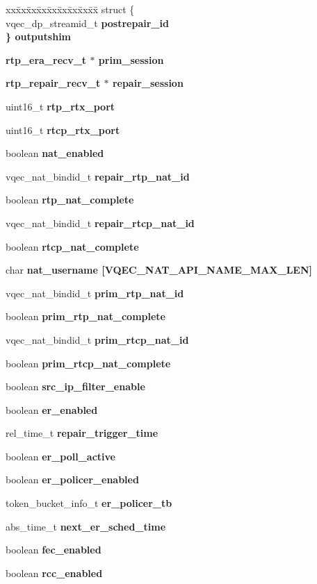 \begin{CompactItemize}
\begin{tabbing}
\end{tabbing}\item 
\begin{tabbing}
xx\=xx\=xx\=xx\=xx\=xx\=xx\=xx\=xx\=\kill
struct \{\\
\>vqec\_dp\_streamid\_t \bf{postrepair\_id}\\
\} \bf{outputshim}\\

\end{tabbing}\item 
\bf{rtp\_\-era\_\-recv\_\-t} $\ast$ \bf{prim\_\-session}
\item 
\bf{rtp\_\-repair\_\-recv\_\-t} $\ast$ \bf{repair\_\-session}
\item 
uint16\_\-t \bf{rtp\_\-rtx\_\-port}
\item 
uint16\_\-t \bf{rtcp\_\-rtx\_\-port}
\item 
boolean \bf{nat\_\-enabled}
\item 
vqec\_\-nat\_\-bindid\_\-t \bf{repair\_\-rtp\_\-nat\_\-id}
\item 
boolean \bf{rtp\_\-nat\_\-complete}
\item 
vqec\_\-nat\_\-bindid\_\-t \bf{repair\_\-rtcp\_\-nat\_\-id}
\item 
boolean \bf{rtcp\_\-nat\_\-complete}
\item 
char \bf{nat\_\-username} [VQEC\_\-NAT\_\-API\_\-NAME\_\-MAX\_\-LEN]
\item 
vqec\_\-nat\_\-bindid\_\-t \bf{prim\_\-rtp\_\-nat\_\-id}
\item 
boolean \bf{prim\_\-rtp\_\-nat\_\-complete}
\item 
vqec\_\-nat\_\-bindid\_\-t \bf{prim\_\-rtcp\_\-nat\_\-id}
\item 
boolean \bf{prim\_\-rtcp\_\-nat\_\-complete}
\item 
boolean \bf{src\_\-ip\_\-filter\_\-enable}
\item 
boolean \bf{er\_\-enabled}
\item 
rel\_\-time\_\-t \bf{repair\_\-trigger\_\-time}
\item 
boolean \bf{er\_\-poll\_\-active}
\item 
boolean \bf{er\_\-policer\_\-enabled}
\item 
token\_\-bucket\_\-info\_\-t \bf{er\_\-policer\_\-tb}
\item 
abs\_\-time\_\-t \bf{next\_\-er\_\-sched\_\-time}
\item 
boolean \bf{fec\_\-enabled}
\item 
boolean \bf{rcc\_\-enabled}

\end{CompactItemize}
